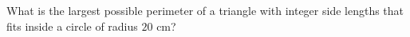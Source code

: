 What is the largest possible perimeter of a triangle with integer side lengths that fits inside a circle of radius $20$ cm?
